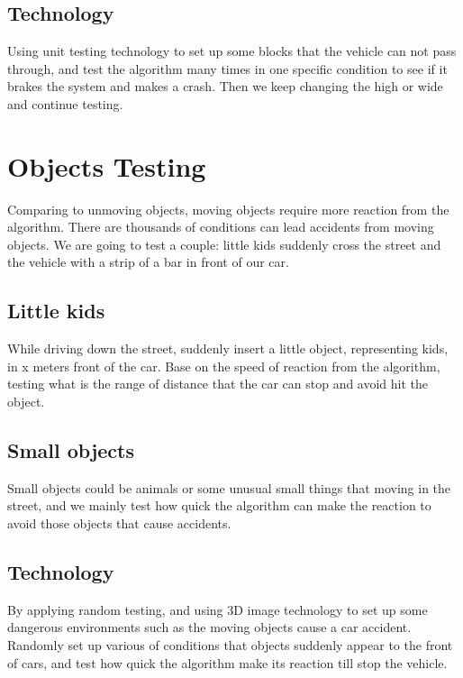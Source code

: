 \documentclass[10pt,draftclsnofoot,onecolumn,journal,compsoc]{IEEEtran}
\begin{document}
\subsection{Technology}
Using unit testing technology to set up some blocks that the vehicle can not pass through, and test the algorithm many times in one specific condition to see if it brakes the system and makes a crash. Then we keep changing the high or wide and continue testing.


\section{Objects Testing}
Comparing to unmoving objects, moving objects require more reaction from the algorithm. There are thousands of conditions can lead accidents from moving objects. We are going to test a couple: little kids suddenly cross the street and the vehicle with a strip of a bar in front of our car.   
\subsection{Little kids}
While driving down the street, suddenly insert a little object, representing kids, in x meters front of the car. Base on the speed of reaction from the algorithm, testing what is the range of distance that the car can stop and avoid hit the object.

\subsection{Small objects}
Small objects could be animals or some unusual small things that moving in the street, and we mainly test how quick the algorithm can make the reaction to avoid those objects that cause accidents.

\subsection{Technology}
By applying random testing, and using 3D image technology to set up some dangerous environments such as the moving objects cause a car accident. Randomly set up various of conditions that objects suddenly appear to the front of cars, and test how quick the algorithm make its reaction till stop the vehicle.

\end{document}
